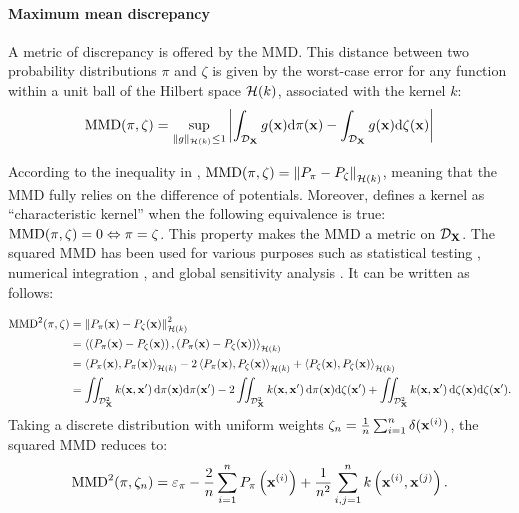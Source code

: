 \paragraph{Maximum mean discrepancy}
A metric of discrepancy is offered by the MMD. 
This distance between two probability distributions $\pi$ and $\zeta$ is given by the worst-case error for any function within a unit ball of the Hilbert space $\mathcal{H}(k)$, associated with the kernel $k$:
\begin{equation}
    \MMD(\pi, \zeta) = %
    \sup_{\lVert g \lVert_{\iH(k)} \leq 1}
            \left | \int_{\iD_{\bX}} g(\bx) \dd \pi(\bx) - \int_{\iD_{\bX}} g(\bx) \dd \zeta(\bx) \right| %
    \label{eq:mmd_c4}  
\end{equation}

According to the inequality in , $\mathrm{MMD}(\pi, \zeta) = \left\lVert P_{\pi} - P_{\zeta} \right\lVert_{\mathcal{H}(k)}$, meaning that the MMD fully relies on the difference of potentials. 
Moreover, \cite{sriperumbudur_2010} defines a kernel as ``characteristic kernel'' when the following equivalence is true: $\mathrm{MMD}(\pi, \zeta) = 0 \Leftrightarrow \pi = \zeta$. 
This property makes the MMD a metric on $\mathcal{D}_{{\bf X}}$. 
The squared MMD has been used for various purposes such as statistical testing \citep{gretton_2006}, numerical integration \citep{chen_welling_2010}, and global sensitivity analysis \citep{daveiga_2015}. 
It can be written as follows:

\begin{subequations}
\begin{align}
    \mathrm{MMD}^2(\pi, \zeta) &= \left\lVert P_{\pi}({\bf x}) - P_{\zeta}({\bf x}) \right\lVert^2_{\mathcal{H}(k)}\\
        &= \left\langle \left(P_{\pi}({\bf x}) - P_{\zeta}({\bf x}) \right), \left(P_{\pi}({\bf x}) - P_{\zeta}({\bf x}) \right) \right\rangle_{\mathcal{H}(k)}\\
        &= \left\langle P_{\pi}({\bf x}), P_{\pi}({\bf x}) \right\rangle_{\mathcal{H}(k)} - 2 \left\langle P_{\pi}({\bf x}), P_{\zeta}({\bf x}) \right\rangle_{\mathcal{H}(k)} + \left\langle P_{\zeta}({\bf x}), P_{\zeta}({\bf x}) \right\rangle_{\mathcal{H}(k)}\\
        &= \iint_{\mathcal{D}_{{\bf X}}^2} k({\bf x}, {\bf x}')\, \mathrm{d}\pi({\bf x}) \mathrm{d}\pi({\bf x}') - 2 \iint_{\mathcal{D}_{{\bf X}}^2} k({\bf x}, {\bf x}')\, \mathrm{d}\pi({\bf x}) \mathrm{d}\zeta({\bf x}') + \iint_{\mathcal{D}_{{\bf X}}^2} k({\bf x}, {\bf x}')\, \mathrm{d}\zeta({\bf x}) \mathrm{d}\zeta({\bf x}').
\end{align}
\end{subequations}
Taking a discrete distribution with uniform weights $\zeta_n= \frac{1}{n} \sum_{i=1}^{n} \delta({\bf x}^{(i)})$, the squared MMD reduces to: 
\begin{equation}\label{eq:mmd_design}
    \mathrm{MMD}^2(\pi, \zeta_n) = \varepsilon_\pi - \frac{2}{n} \sum_{i=1}^n P_{\pi}\left({\bf x}^{(i)}\right) + \frac{1}{n^2} \sum_{i, j=1}^n k\left({\bf x}^{(i)}, {\bf x}^{(j)}\right).
\end{equation}


